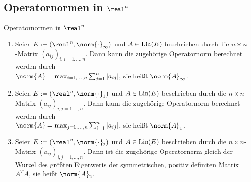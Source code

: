\subsection{%
    Operatornormen in \texorpdfstring{$\real^n$}{ℝⁿ}%
}

\begin{Satz}{Operatornormen in $\real^n$}
    \begin{enumerate}
        \item
        Seien $E := (\real^n, \norm{\cdot}_\infty)$ und $A \in \operatorname{Lin}(E)$
        beschrieben durch die $n \times n$-Matrix $(a_{ij})_{i,j=1,\dotsc,n}$.
        Dann kann die zugehörige Operatornorm berechnet werden durch\\
        $\norm{A} = \max_{i=1,\dotsc,n} \sum_{j=1}^n |a_{ij}|$,
        sie heißt  $\norm{A}_\infty$.
        
        \item
        Seien $E := (\real^n, \norm{\cdot}_1)$ und $A \in \operatorname{Lin}(E)$
        beschrieben durch die $n \times n$-Matrix $(a_{ij})_{i,j=1,\dotsc,n}$.
        Dann kann die zugehörige Operatornorm berechnet werden durch\\
        $\norm{A} = \max_{j=1,\dotsc,n} \sum_{i=1}^n |a_{ij}|$,
        sie heißt  $\norm{A}_1$.
        
        \item
        Seien $E := (\real^n, \norm{\cdot}_2)$ und $A \in \operatorname{Lin}(E)$
        beschrieben durch die $n \times n$-Matrix $(a_{ij})_{i,j=1,\dotsc,n}$.
        Dann ist die zugehörige Operatornorm gleich der Wurzel des größten Eigenwerts
        der symmetrischen, positiv definiten Matrix $A^T A$,
        sie heißt  $\norm{A}_2$.
    \end{enumerate}
\end{Satz}

\pagebreak
